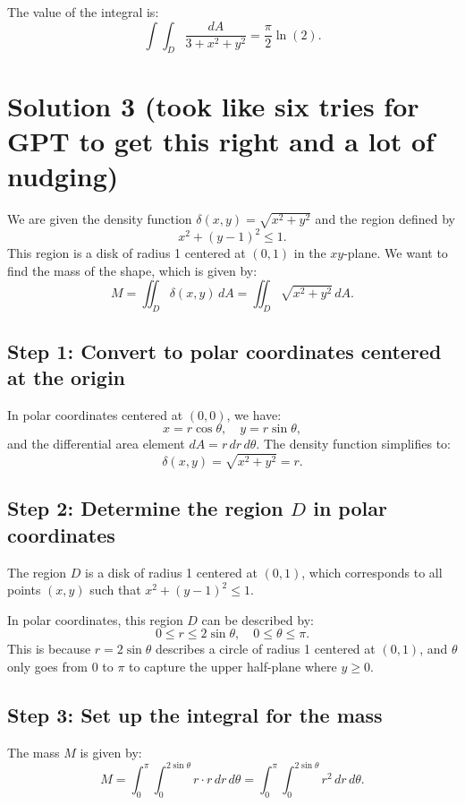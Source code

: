 \documentclass[11pt]{article}
\begin{document}
The value of the integral is:
\[
\int \int_{D} \frac{dA}{3 + x^2 + y^2} = \frac{\pi}{2} \ln(2).
\]

\newpage
\section{Solution 3 (took like six tries for GPT to get this right and a lot of nudging)}

We are given the density function \( \delta(x, y) = \sqrt{x^2 + y^2} \) and the region defined by
\[
x^2 + (y - 1)^2 \leq 1.
\]
This region is a disk of radius 1 centered at \( (0, 1) \) in the \( xy \)-plane. We want to find the mass of the shape, which is given by:
\[
M = \iint_{D} \delta(x, y) \, dA = \iint_{D} \sqrt{x^2 + y^2} \, dA.
\]
\newpage

\subsection{Step 1: Convert to polar coordinates centered at the origin}

In polar coordinates centered at \( (0, 0) \), we have:
\[
x = r \cos \theta, \quad y = r \sin \theta,
\]
and the differential area element \( dA = r \, dr \, d\theta \). The density function simplifies to:
\[
\delta(x, y) = \sqrt{x^2 + y^2} = r.
\]
\newpage

\subsection{Step 2: Determine the region \( D \) in polar coordinates}

The region \( D \) is a disk of radius 1 centered at \( (0, 1) \), which corresponds to all points \( (x, y) \) such that \( x^2 + (y - 1)^2 \leq 1 \).

In polar coordinates, this region \( D \) can be described by:
\[
0 \leq r \leq 2 \sin \theta, \quad 0 \leq \theta \leq \pi.
\]
This is because \( r = 2 \sin \theta \) describes a circle of radius 1 centered at \( (0, 1) \), and \( \theta \) only goes from \( 0 \) to \( \pi \) to capture the upper half-plane where \( y \geq 0 \).
\newpage

\subsection{Step 3: Set up the integral for the mass}

The mass \( M \) is given by:
\[
M = \int_{0}^{\pi} \int_{0}^{2 \sin \theta} r \cdot r \, dr \, d\theta = \int_{0}^{\pi} \int_{0}^{2 \sin \theta} r^2 \, dr \, d\theta.
\]
\newpage
\end{document}
